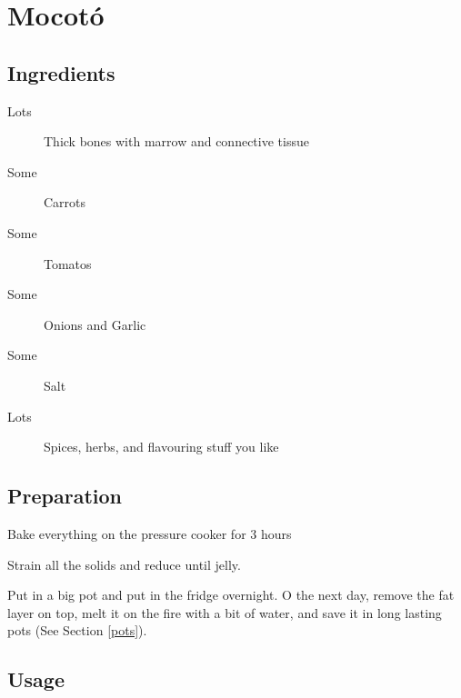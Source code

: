 \setchapterpreamble[u]{\margintoc}
\chapter{Mocotó}\label{mocoto}

\section{Ingredients}

\begin{multicols}{2}
	\begin{description}
		\item[Lots] Thick bones with marrow and connective tissue 
		\item[Some] Carrots
		\item[Some] Tomatos
		\item[Some] Onions and Garlic
		\item[Some] Salt
		\item[Lots] Spices, herbs, and flavouring stuff you like
	\end{description}
\end{multicols}	

\section{Preparation}
Bake everything on the pressure cooker for $3$ hours

Strain all the solids and reduce until jelly.

Put in a big pot and put in the fridge overnight. O the next day, remove the fat layer on top, melt it on the fire with a bit of water, and save it in long lasting pots (See Section \ref{pots}).
\section{Usage}

